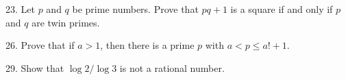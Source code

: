 \begin{mdframed}[style=darkAnswer,frametitle={Joe Starr}]
    
\end{mdframed}
\newpage
\begin{mdframed}[style=darkQuesion]
23. Let $p$ and $q$ be prime numbers. Prove that $pq+1$ is a square if and only 
if $p$ and $q$ are twin primes.
\end{mdframed}

\begin{mdframed}[style=darkAnswer,frametitle={Joe Starr}]
    
\end{mdframed}
\newpage
\begin{mdframed}[style=darkQuesion]
26. Prove that if $a>1$, then there is a prime $p$ with $a<p\leq a!+1$.
\end{mdframed}

\begin{mdframed}[style=darkAnswer,frametitle={Joe Starr}]
    
\end{mdframed}
\newpage
\begin{mdframed}[style=darkQuesion]
29. Show that $\log{2}/\log{3}$ is not a rational number. 
\end{mdframed}

\begin{mdframed}[style=darkAnswer,frametitle={Joe Starr}]
    
\end{mdframed}


